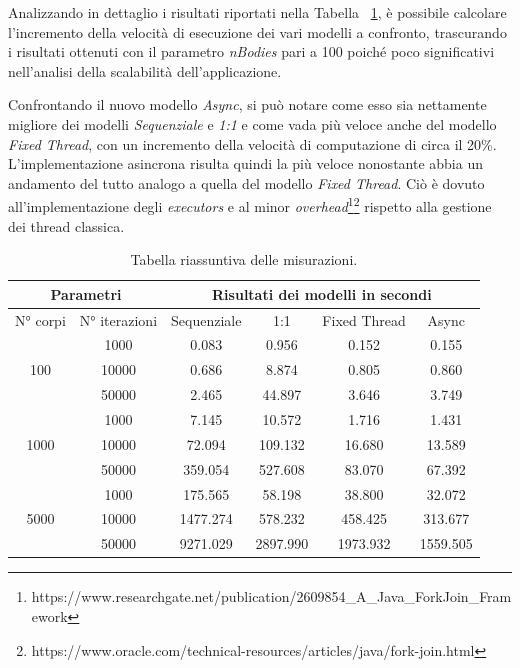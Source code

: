 Analizzando in dettaglio i risultati riportati nella Tabella ~\ref{tab:perf}, è possibile calcolare l'incremento della velocità di esecuzione dei vari modelli a confronto, trascurando i risultati ottenuti con il parametro \textit{nBodies} pari a 100 poiché poco significativi nell'analisi della scalabilità dell'applicazione.

Confrontando il nuovo modello \textit{Async}, si può notare come esso sia nettamente migliore dei modelli \textit{Sequenziale} e \textit{1:1} e come vada  più veloce anche del modello \textit{Fixed Thread}, con un incremento della velocità di computazione di circa il 20\%.
L'implementazione asincrona risulta quindi la più veloce nonostante abbia un andamento del tutto analogo a quella del modello \textit{Fixed Thread}. Ciò è dovuto all'implementazione degli \textit{executors} e al minor \textit{overhead}\footnote{https://www.researchgate.net/publication/2609854\_A\_Java\_ForkJoin\_Framework}\footnote{https://www.oracle.com/technical-resources/articles/java/fork-join.html} rispetto alla gestione dei thread classica.

\begin{table}[ht]
    \centering
    \begin{tabular}{|c|c|c|c|c|c|}
        \hline
        \multicolumn{2}{|c|}{Parametri} & \multicolumn{4}{|c|}{Risultati dei modelli in secondi} \\
        \hline
        N° corpi & N° iterazioni & Sequenziale & 1:1 & Fixed Thread & Async \\
        \hline
        & 1000 & 0.083 & 0.956 & 0.152 & 0.155 \\
        100 & 10000 & 0.686 & 8.874 & 0.805 & 0.860 \\
        & 50000 & 2.465 & 44.897 & 3.646 & 3.749 \\
        \hline
        & 1000 & 7.145 & 10.572 & 1.716 & 1.431 \\
        1000 & 10000 & 72.094 & 109.132 & 16.680 & 13.589 \\
        & 50000 & 359.054 & 527.608 & 83.070 & 67.392 \\
        \hline
        & 1000 & 175.565 & 58.198 & 38.800 & 32.072 \\
        5000 & 10000 & 1477.274 & 578.232 & 458.425 & 313.677 \\
        & 50000 & 9271.029 & 2897.990 & 1973.932 & 1559.505 \\
        \hline
    \end{tabular}
    \caption{Tabella riassuntiva delle misurazioni.}
    \label{tab:perf}
\end{table}

